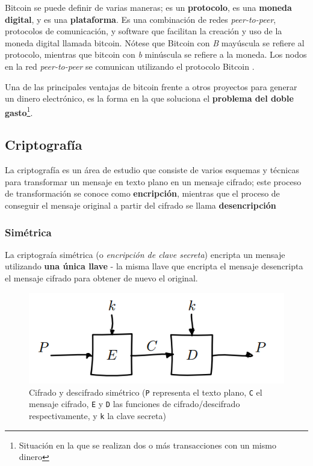 Bitcoin se puede definir de varias maneras; es un \textbf{protocolo}, es una \textbf{moneda digital}, y es una \textbf{plataforma}. Es una combinación de redes \emph{peer-to-peer}, protocolos de comunicación, y software que facilitan la creación y uso de la moneda digital llamada bitcoin. Nótese que Bitcoin con \emph{B} mayúscula se refiere al protocolo, mientras que bitcoin con \emph{b} minúscula se refiere a la moneda. Los nodos en la red \emph{peer-to-peer} se comunican utilizando el protocolo Bitcoin \autocite{MasteringBlockchainBitcoin}.  

Una de las principales ventajas de bitcoin frente a otros proyectos para generar un dinero electrónico, es la forma en la que soluciona el \textbf{problema del doble gasto}\footnote{Situación en la que se realizan dos o más transacciones con un mismo dinero}.

\subsection{Criptografía}

La criptografía es un área de estudio que consiste de varios esquemas y técnicas para transformar un mensaje en texto plano en un mensaje cifrado; este proceso de transformación se conoce como \textbf{encripción}, mientras que el proceso de conseguir el mensaje original a partir del cifrado se llama \textbf{desencripción} \autocite{StallingsCryptography}

\subsubsection{Simétrica}

La criptograía simétrica (o \emph{encripción de clave secreta}) encripta un mensaje utilizando \textbf{una única llave} - la misma llave que encripta el mensaje desencripta el mensaje cifrado para obtener de nuevo el original. 

\begin{figure}[H]
    \centering
    \includegraphics[width=0.8\linewidth]{images/van-houvten-simetrico.png}
    \caption*{Cifrado y descifrado simétrico (\texttt{P} representa el texto plano, \texttt{C} el mensaje cifrado, \texttt{E} y \texttt{D} las funciones de cifrado/descifrado respectivamente, y \texttt{k} la clave secreta) \autocite{VanhouvtenBlockCiphers}}
\end{figure}

